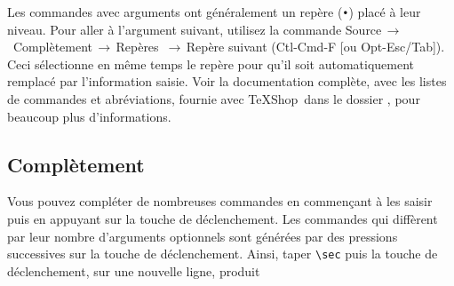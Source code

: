 \documentclass[11pt,french]{article}
\newcommand{\TS}{\textsf{\TeX Shop}}
\newcommand{\cmd}[1]{\textsf{#1}}
\newcommand{\mnu}[1]{\textsf{#1}}
\newcommand{\To}{\,\(\to\)\,}
\begin{document}
Les commandes avec arguments ont généralement un repère (\texttt{•}) placé à leur niveau. Pour aller à l'argument suivant, utilisez la commande \mnu{Source}\To\ \mnu{Complètement}\To\mnu{Repères} \To\mnu{Repère suivant} (\cmd{Ctl-Cmd-F} [ou \cmd{Opt-Esc/Tab}]). Ceci sélectionne en même temps le repère pour qu'il soit automatiquement remplacé par l'information saisie. Voir la documentation complète, avec les listes de commandes et abréviations, fournie avec \TS\ dans le dossier , pour beaucoup plus d'informations.

%

\subsection{Complètement}

Vous pouvez compléter de nombreuses commandes en commençant à les saisir puis en appuyant sur la touche de déclenchement. Les commandes qui diffèrent par leur nombre d'arguments optionnels sont générées par des pressions successives sur la touche de déclenchement. Ainsi, taper \verb|\sec| puis la touche de déclenchement, sur une nouvelle ligne, produit
\end{document}
